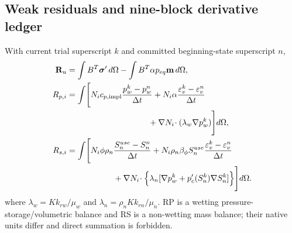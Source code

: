 \documentclass[preprint,12pt,authoryear]{elsarticle}
\begin{document}
\subsection{Weak residuals and nine-block derivative ledger}

With current trial superscript $k$ and committed beginning-state superscript $n$,
\begin{align}
\mathbf R_u &= \int B^T\boldsymbol\sigma'\,d\Omega
-\int B^T\alpha p_{eq}\mathbf m\,d\Omega,\\
R_{p,i} &= \int\!\Bigg[
N_i c_{p,\mathrm{impl}}\frac{p_w^k-p_w^n}{\Delta t}
+N_i\alpha\frac{\varepsilon_v^k-\varepsilon_v^n}{\Delta t}\notag\\
&\hspace{35mm}+\nabla N_i\!\cdot(\lambda_w\nabla p_w^k)\Bigg]d\Omega,\\
R_{s,i} &= \int\!\Bigg[
N_i\phi\rho_n\frac{S_n^{use}-S_n^n}{\Delta t}
+N_i\rho_n\beta_\phi S_n^{use}
\frac{\varepsilon_v^k-\varepsilon_v^n}{\Delta t}\notag\\
&\hspace{20mm}+\nabla N_i\!\cdot\Big\{\lambda_n
[\nabla p_w^k+p_c'(S_n^k)\nabla S_n^k]\Big\}\Bigg]d\Omega.
\end{align}
where $\lambda_w=Kk_{rw}/\mu_w$ and $\lambda_n=\rho_nKk_{rn}/\mu_n$. RP is a wetting pressure-storage/volumetric balance and RS is a non-wetting mass balance; their native units differ and direct summation is forbidden.
\end{document}
